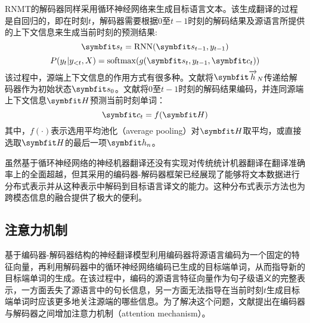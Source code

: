 RNMT的解码器同样采用循环神经网络来生成目标语言文本。该生成翻译的过程是自回归的，即在时刻$t$，解码器需要根据$0$至$t-1$时刻的解码结果及源语言所提供的上下文信息来生成当前时刻的预测结果:
\begin{equation}
    \Vector{s}_t=\mathrm{RNN}(\Vector{s_{t-1}},y_{t-1})
\end{equation}
\begin{equation}
    P(y_t|y_{<t},X)=\mathrm{softmax}(g(\Vector{s_t}, y_{t-1}, \Vector{c_t}))
\end{equation}
该过程中，源端上下文信息的作用方式有很多种。文献\cite{1_DBLP:journals/corr/SutskeverVL14}将$\rarwvec{h}_N$传递给解码器作为初始状态$\Vector{s_0}$。文献\cite{2_cho-etal-2014-learning}将$0$至$t-1$时刻的解码结果编码，并连同源端上下文信息$\Vector{H}$预测当前时刻单词：
\begin{equation}
    \Vector{c_t}=f(\Vector{H})
\end{equation}
其中，$f(\cdot)$表示选用平均池化（average pooling）对$\Vector{H}$取平均，或直接选取$\Vector{H}$的最后一项$\Vector{h_n}$。

虽然基于循环神经网络的神经机器翻译还没有实现对传统统计机器翻译在翻译准确率上的全面超越，但其采用的编码器-解码器框架已经展现了能够将文本数据进行分布式表示并从这种表示中解码到目标语言译文的能力。这种分布式表示方法也为跨模态信息的融合提供了极大的便利。

\subsection{注意力机制}
基于编码器-解码器结构的神经翻译模型利用编码器将源语言编码为一个固定的特征向量，再利用解码器中的循环神经网络编码已生成的目标端单词，从而指导新的目标端单词的生成。在该过程中，编码的源语言特征向量作为句子级语义的完整表示，一方面丢失了源语言中的句长信息，另一方面无法指导在当前时刻$t$生成目标端单词时应该更多地关注源端的哪些信息。为了解决这个问题，文献\cite{3_DBLP:journals/corr/BahdanauCB14}提出在编码器与解码器之间增加注意力机制（attention mechanism）。

